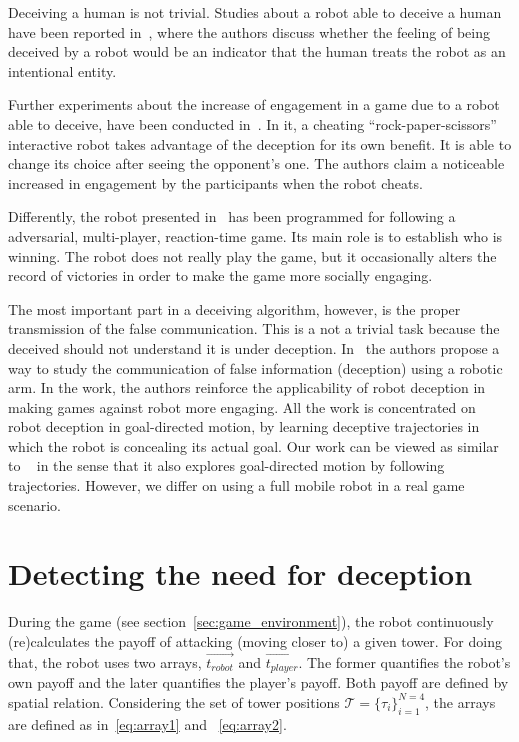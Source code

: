 Deceiving a human is not trivial. Studies about a robot able to deceive a human have been reported in~\cite{terada_can_2010}, where the authors discuss whether the feeling of being deceived by a robot would be an indicator that the human treats the robot as an intentional entity. 

Further experiments about the increase of engagement in a game due to a robot able to deceive, have been conducted in~\cite{short_no_2010}. In it, a cheating ``rock-paper-scissors'' interactive robot takes advantage of the deception for its own benefit. It is able to change its choice after seeing the opponent's one. The authors claim a noticeable increased in engagement by the participants when the robot cheats.

Differently, the robot presented in~\cite{vazquez_deceptive_2011} has been programmed for following a adversarial, multi-player, reaction-time game. Its main role is to establish who is winning. The robot does not really play the game, but it occasionally alters the record of victories in order to make the game more socially engaging.

The most important part in a deceiving algorithm, however, is the proper transmission of the false communication. This is a not a trivial task because the deceived should not understand it is under deception. In~\cite{dragan_analysis_2014} the authors propose a way to study the communication of false information (deception) using a robotic arm. In the work, the authors reinforce the applicability of robot deception in making games against robot more engaging. All the work is concentrated on robot deception in goal-directed motion, by learning deceptive trajectories in which the robot is concealing its actual goal. Our work can be viewed as similar to ~\cite{dragan_analysis_2014} in the sense that it also explores goal-directed motion by following trajectories. However, we differ on using a full mobile robot in a real game scenario. 

\section{Detecting the need for deception}\label{sec:deception_detecting_it}
During the game (see section~\ref{sec:game_environment}), the robot continuously (re)calculates the payoff of attacking (moving closer to) a given tower. For doing that, the robot uses two arrays, $\overrightarrow{t_{robot}}$ and $\overrightarrow{t_{player}}$. The former quantifies the robot's own payoff and the later quantifies the player's payoff. Both payoff are defined by spatial relation. Considering the set of tower positions $\mathcal{T} = \{\tau_{i}\}_{i=1}^{N=4}$, the arrays are defined as in~\ref{eq:array1} and ~\ref{eq:array2}.

